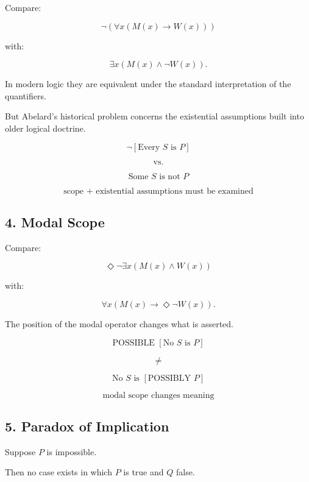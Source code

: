 \documentclass[11pt]{article}
\begin{document}
Compare:

\[
\neg(\forall x(M(x)\rightarrow W(x)))
\]

with:

\[
\exists x(M(x)\land \neg W(x)).
\]

In modern logic they are equivalent under the standard
interpretation of the quantifiers.

But Abelard's historical problem concerns the existential
assumptions built into older logical doctrine.

\begin{whiteboard}
\[
\neg[\text{Every }S\text{ is }P]
\]

\[
\text{vs.}
\]

\[
\text{Some }S\text{ is not }P
\]

\[
\boxed{\text{scope + existential assumptions must be examined}}
\]
\end{whiteboard}


\subsection*{4. Modal Scope}

Compare:

\[
\Diamond\neg\exists x(M(x)\land W(x))
\]

with:

\[
\forall x(M(x)\rightarrow \Diamond\neg W(x)).
\]

The position of the modal operator changes what is asserted.

\begin{whiteboard}
\[
\text{POSSIBLE }[\text{No }S\text{ is }P]
\]

\[
\neq
\]

\[
\text{No }S\text{ is }[\text{POSSIBLY }P]
\]

\[
\boxed{\text{modal scope changes meaning}}
\]
\end{whiteboard}


\subsection*{5. Paradox of Implication}

Suppose \(P\) is impossible.

Then no case exists in which \(P\) is true and \(Q\) false.
\end{document}
